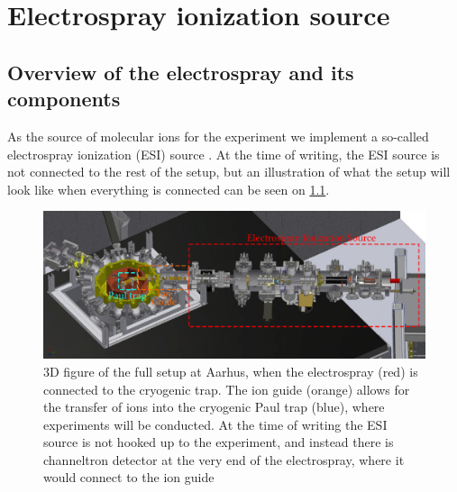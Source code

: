 \chapter{Electrospray ionization source}
\label{chap:ESI}

\section{Overview of the electrospray and its components}
As the source of molecular ions for the experiment we implement a so-called electrospray ionization (ESI) source \cite{FennEsi,Kjaer2021-lm}. At the time of writing, the ESI source is not connected to the rest of the setup, but an illustration of what the setup will look like when everything is connected can be seen on \cref{fig:fullSetup}.
\begin{figure}
    \centering
    \includegraphics[width = 1.1\textwidth]{main/spray.pdf}
    \caption{3D figure of the full setup at Aarhus, when the electrospray (red) is connected to the cryogenic trap. The ion guide (orange) allows for the transfer of ions into the cryogenic Paul trap (blue), where experiments will be conducted. At the time of writing the ESI source is not hooked up to the experiment, and instead there is channeltron detector at the very end of the electrospray, where it would connect to the ion guide}
    \label{fig:fullSetup}
\end{figure}


